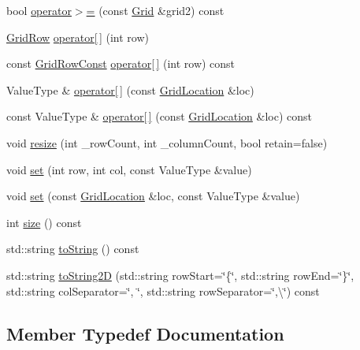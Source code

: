 \begin{DoxyCompactItemize}
$$\item 
bool \mbox{\hyperlink{classGrid_a21431c500035c200656a8d67e96531c7}{operator$>$=}} (const \mbox{\hyperlink{classGrid}{Grid}} \&grid2) const
\item 
\mbox{\hyperlink{classGrid_1_1GridRow}{Grid\+Row}} \mbox{\hyperlink{classGrid_aa62a62fb923c387dbec19d9559fea429}{operator\mbox{[}$\,$\mbox{]}}} (int row)
\item 
const \mbox{\hyperlink{classGrid_1_1GridRowConst}{Grid\+Row\+Const}} \mbox{\hyperlink{classGrid_a8b881f7fb1e524d4cf2766bde140eeb1}{operator\mbox{[}$\,$\mbox{]}}} (int row) const
\item 
Value\+Type \& \mbox{\hyperlink{classGrid_afcc1243cd81603e13b8f223f0ceabe96}{operator\mbox{[}$\,$\mbox{]}}} (const \mbox{\hyperlink{structGridLocation}{Grid\+Location}} \&loc)
\item 
const Value\+Type \& \mbox{\hyperlink{classGrid_a914315640e381831ab30403063205359}{operator\mbox{[}$\,$\mbox{]}}} (const \mbox{\hyperlink{structGridLocation}{Grid\+Location}} \&loc) const
\item 
void \mbox{\hyperlink{classGrid_aa8036710a8d91046066eacbb8548b6fc}{resize}} (int \+\_\+row\+Count, int \+\_\+column\+Count, bool retain=false)
\item 
void \mbox{\hyperlink{classGrid_a6f5cee26d171f36d280a15c51332efc2}{set}} (int row, int col, const Value\+Type \&value)
\item 
void \mbox{\hyperlink{classGrid_a02a61287a9aee6a1ff7e8a8325ce094d}{set}} (const \mbox{\hyperlink{structGridLocation}{Grid\+Location}} \&loc, const Value\+Type \&value)
\item 
int \mbox{\hyperlink{classGrid_af9593d4a5ff4274efaf429cb4f9e57cc}{size}} () const
\item 
std\+::string \mbox{\hyperlink{classGrid_a1fe5121d6528fdea3f243321b3fa3a49}{to\+String}} () const
\item 
std\+::string \mbox{\hyperlink{classGrid_a8e636ad8b56218c7e0162d6c1bd78b39}{to\+String2D}} (std\+::string row\+Start=\char`\"{}\{\char`\"{}, std\+::string row\+End=\char`\"{}\}\char`\"{}, std\+::string col\+Separator=\char`\"{}, \char`\"{}, std\+::string row\+Separator=\char`\"{},\textbackslash{}\char`\"{}) const
\end{DoxyCompactItemize}


\subsection{Member Typedef Documentation}
\mbox{\label{classGrid_aab30a5ff3fa2aff5b1f8b875438a3609}} 

